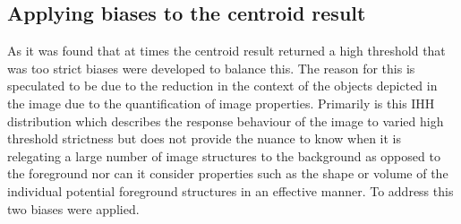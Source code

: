 \subsection{Applying biases to the centroid result}\label{sec:system_biases}
As it was found that at times the centroid result returned a high threshold that was too strict biases were developed to balance this. The reason for this is speculated to be due to the reduction in the context of the objects depicted in the image due to the quantification of image properties. Primarily is this IHH distribution which describes the response behaviour of the image to varied high threshold strictness but does not provide the nuance to know when it is relegating a large number of image structures to the background as opposed to the foreground nor can it consider properties such as the shape or volume of the individual potential foreground structures in an effective manner. To address this two biases were applied.

